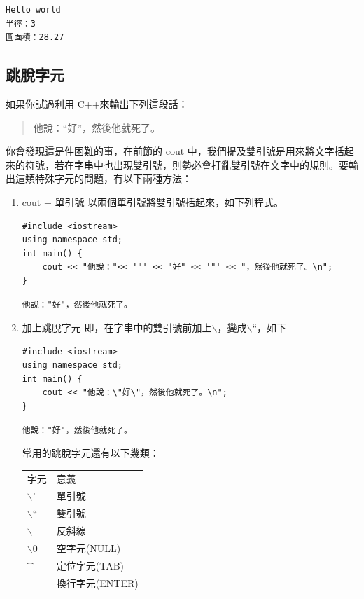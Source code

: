\documentclass[a4paper,12pt]{article}
\begin{document}
\begin{verbatim}
Hello world
半徑：3
圓面積：28.27
\end{verbatim}

\subsection{跳脫字元}
\label{sec:org2daab1e}
如果你試過利用 C++來輸出下列這段話：\\
\begin{verse}
他說：``好''，然後他就死了。\\
\end{verse}
你會發現這是件困難的事，在前節的 cout 中，我們提及雙引號是用來將文字括起來的符號，若在字串中也出現雙引號，則勢必會打亂雙引號在文字中的規則。要輸出這類特殊字元的問題，有以下兩種方法：\\
\begin{enumerate}
\item cout + 單引號
\label{sec:org3159465}
以兩個單引號將雙引號括起來，如下列程式。\\
\lstset{breaklines=true,language=cpp,label= ,caption= ,captionpos=b,firstnumber=1,numbers=left}
\begin{lstlisting}
#include <iostream>
using namespace std;
int main() {
    cout << "他說："<< '"' << "好" << '"' << "，然後他就死了。\n";
}
\end{lstlisting}

\begin{verbatim}
他說："好"，然後他就死了。
\end{verbatim}
\item 加上跳脫字元
\label{sec:org3160745}
即，在字串中的雙引號前加上$\backslash$，變成$\backslash$``，如下\\
\lstset{breaklines=true,language=cpp,label= ,caption= ,captionpos=b,firstnumber=1,numbers=left}
\begin{lstlisting}
#include <iostream>
using namespace std;
int main() {
    cout << "他說：\"好\"，然後他就死了。\n";
}
\end{lstlisting}

\begin{verbatim}
他說："好"，然後他就死了。
\end{verbatim}


常用的跳脫字元還有以下幾類：\\
\begin{center}
\begin{tabular}{ll}
字元 & 意義\\
$\backslash$' & 單引號\\
$\backslash$`` & 雙引號\\
$\backslash$\ & 反斜線\\
$\backslash$0 & 空字元(NULL)\\
\t & 定位字元(TAB)\\
\n & 換行字元(ENTER)\\
\end{tabular}
\end{center}
\end{enumerate}
\end{document}
